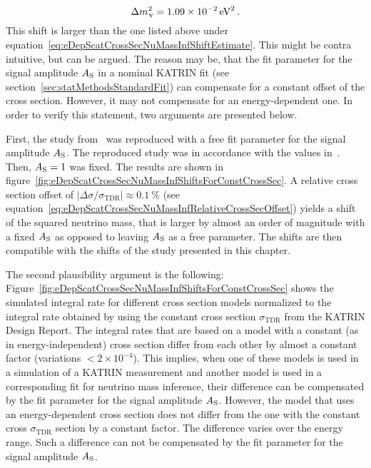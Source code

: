 \begin{equation}
	\Delta m_\upnu^2 = \SI{1.09e-2}{eV^2}
	\text{\,.}
\end{equation}
This shift is larger than the one listed above under equation~\eqref{eq:eDepScatCrossSecNuMassInfShiftEstimate}. This might be contra intuitive, but can be argued. The reason may be, that the fit parameter for the signal amplitude $A_{\mathrm{S}}$ in a nominal KATRIN fit (see section~\ref{sec:statMethodsStandardFit}) can compensate for a constant offset of the cross section. However, it may not compensate for an energy-dependent one. In order to verify this statement, two arguments are presented below.

First, the study from~\cite{Groh2015} was reproduced with a free fit parameter for the signal amplitude $A_{\mathrm{S}}$. The reproduced study was in accordance with the values in~\cite{Groh2015}. Then, $A_{\mathrm{S}}=1$ was fixed. The results are shown in figure~\ref{fig:eDepScatCrossSecNuMassInfShiftsForConstCrossSec}. A relative cross section offset of $
\left|
	\Delta\sigma/\sigma_\mathrm{TDR}
\right| \approx \SI{0.1}{\percent}
$ (see equation~\ref{eq:eDepScatCrossSecNuMassInfRelativeCrossSecOffset}) yields a shift of the squared neutrino mass, that is larger by almost an order of magnitude with a fixed $A_{\mathrm{S}}$ as opposed to leaving $A_{\mathrm{S}}$ as a free parameter. The shifts are then compatible with the shifts of the study presented in this chapter.

The second plausibility argument is the following: Figure~\ref{fig:eDepScatCrossSecNuMassInfShiftsForConstCrossSec} shows the simulated integral rate for different cross section models normalized to the integral rate obtained by using the constant cross section $\sigma_\mathrm{TDR}$ from the KATRIN Design Report. The integral rates that are based on a model with a constant (as in energy-independent) cross section differ from each other by almost a constant factor (variations $<2\times10^{-4}$). This implies, when one of these models is used in a simulation of a KATRIN measurement and another model is used in a corresponding fit for neutrino mass inference, their difference can be compensated by the fit parameter for the signal amplitude $A_{\mathrm{S}}$. However, the model that uses an energy-dependent cross section does not differ from the one with the constant cross $\sigma_\mathrm{TDR}$ section by a constant factor. The difference varies over the energy range. Such a difference can not be compensated by the fit parameter for the signal amplitude $A_{\mathrm{S}}$.

